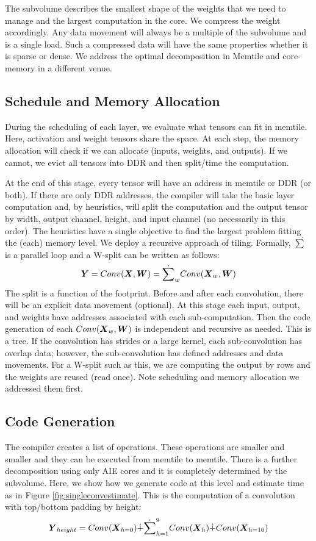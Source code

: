 \documentclass{IEEEtran}
\begin{document}
The subvolume describes the smallest shape of the weights that we need
to manage and the largest computation in the core. We compress the
weight accordingly. Any data movement will always be a multiple of the
subvolume and is a single load. Such a compressed data will have the
same properties whether it is sparse or dense. We address the optimal
decomposition in Memtile and core-memory in a different venue.


\subsection{Schedule and Memory Allocation}
During the scheduling of each layer, we evaluate what tensors can fit
in memtile. Here, activation and weight tensors share the space.  At
each step, the memory allocation will check if we can allocate
(inputs, weights, and outputs). If we cannot, we evict all tensors
into DDR and then split/time the computation.

At the end of this stage, every tensor will have an address in memtile
or DDR (or both). If there are only DDR addresses, the compiler will
take the basic layer computation and, by heuristics, will split the
computation and the output tensor by width, output channel, height,
and input channel (no necessarily in this order). The heuristics have
a single objective to find the largest problem fitting the (each)
memory level. We deploy a recursive approach of tiling.  Formally,
$\dot{\sum}$ is a parallel loop and a W-split can be written as
follows:
\begin{equation}
  {\boldsymbol Y} =  Conv({\boldsymbol X},{\boldsymbol W}) = \dot{\sum}_w
  Conv({\boldsymbol X}_w,{\boldsymbol W})
\end{equation}
The split is a function of the footprint. Before and after each
convolution, there will be an explicit data movement (optional). At
this stage each input, output, and weights have addresses associated
with each sub-computation. Then the code generation of each
$Conv({\boldsymbol X}_w,{\boldsymbol W})$ is independent and recursive as needed. This
is a tree. If the convolution has strides or a large kernel, each
sub-convolution has overlap data; however, the sub-convolution has
defined addresses and data movements. For a W-split such as this, we
are computing the output by rows and the weights are reused (read
once). Note scheduling and memory allocation we addressed them first.

\subsection{Code Generation }
The compiler creates a list of operations. These operations are
smaller and smaller and they can be executed from memtile to
memtile. There is a further decomposition using only AIE cores and it
is completely determined by the subvolume. Here, we show how we
generate code at this level and estimate time as in Figure
\ref{fig:singleconvestimate}.  This is the computation of a
convolution with top/bottom padding by height:
\begin{equation}
  \label{eq:convpadding}
  \Vc{Y}_{height} =   Conv(\Vc{X}_{h=0}) \dot{+} \dot{\sum}_{h=1}^9
  Conv(\Vc{X}_h) \dot{+} Conv(\Vc{X}_{h=10})
\end{equation}
\end{document}
